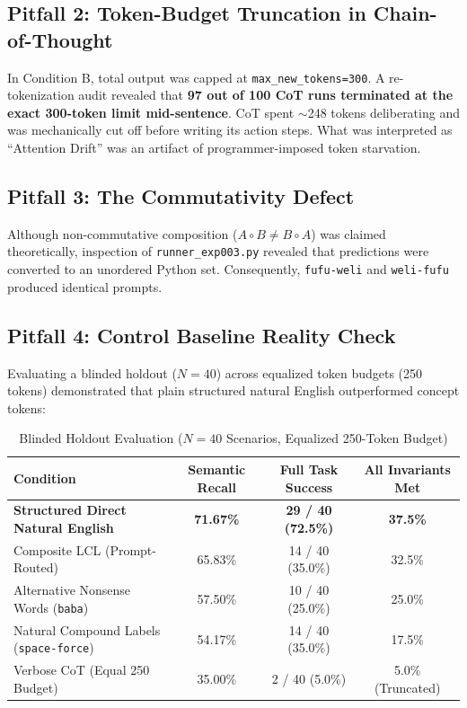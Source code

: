 \documentclass{article}
\begin{document}
\subsection{Pitfall 2: Token-Budget Truncation in Chain-of-Thought}
In Condition B, total output was capped at \texttt{max\_new\_tokens=300}. A re-tokenization audit revealed that \textbf{97 out of 100 CoT runs terminated at the exact 300-token limit mid-sentence}. CoT spent $\sim$248 tokens deliberating and was mechanically cut off before writing its action steps. What was interpreted as ``Attention Drift'' was an artifact of programmer-imposed token starvation.

\subsection{Pitfall 3: The Commutativity Defect}
Although non-commutative composition ($A \circ B \neq B \circ A$) was claimed theoretically, inspection of \texttt{runner\_exp003.py} revealed that predictions were converted to an unordered Python set. Consequently, \texttt{fufu-weli} and \texttt{weli-fufu} produced identical prompts.

\subsection{Pitfall 4: Control Baseline Reality Check}
Evaluating a blinded holdout ($N=40$) across equalized token budgets (250 tokens) demonstrated that plain structured natural English outperformed concept tokens:

\begin{table}[ht]
\centering
\caption{Blinded Holdout Evaluation ($N=40$ Scenarios, Equalized 250-Token Budget)}
\begin{tabular}{lccc}
\toprule
\textbf{Condition} & \textbf{Semantic Recall} & \textbf{Full Task Success} & \textbf{All Invariants Met} \\
\midrule
\textbf{Structured Direct Natural English} & \textbf{71.67\%} & \textbf{29 / 40 (72.5\%)} & \textbf{37.5\%} \\
Composite LCL (Prompt-Routed) & 65.83\% & 14 / 40 (35.0\%) & 32.5\% \\
Alternative Nonsense Words (\texttt{baba}) & 57.50\% & 10 / 40 (25.0\%) & 25.0\% \\
Natural Compound Labels (\texttt{space-force}) & 54.17\% & 14 / 40 (35.0\%) & 17.5\% \\
Verbose CoT (Equal 250 Budget) & 35.00\% & 2 / 40 (5.0\%) & 5.0\% (Truncated) \\
\bottomrule
\end{tabular}
\end{table}
\end{document}
